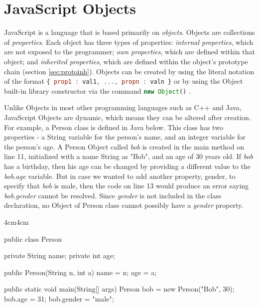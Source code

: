 \documentclass[a4paper,11pt,twoside]{report}
\def\jsinline{\lstinline[language=JavaScript, basicstyle=\small]}%\end{lstlisting}
\begin{document}
\section{JavaScript Objects}
JavaScript is a language that is based primarily on \emph{objects}. Objects are collections of \emph{properties}. Each object has three types of properties: \emph{internal properties}, which are not exposed to the programmer; \emph{own properties}, which are defined within that object; and \emph{inherited properties}, which are defined within the object's prototype chain (section \ref{sec:protoinh}). Objects can be created by using the literal notation of the format \jsinline|{ prop1 : val1, ..., propn : valn }| or by using the Object built-in library constructor via the command \jsinline|new Object()| \cite{EcmaScript}.


Unlike Objects in most other programming languages such as C++ and Java, JavaScript Objects are dynamic, which means they can be altered after creation. For example, a Person class is defined in Java below. This class has two properties - a String variable for the person's name, and an integer variable for the person's age. A Person Object called \textit{bob} is created in the main method on line 11, initialized with a name String as "Bob", and an age of 30 years old. If \textit{bob} has a birthday, then his age can be changed by providing a different value to the \textit{bob.age} variable. But in case we wanted to add another property, gender, to specify that \textit{bob} is male, then the code on line 13 would produce an error saying \textit{bob.gender} cannot be resolved. Since \textit{gender} is not included in the class declaration, no Object of Person class cannot possibly have a \textit{gender} property.

\begin{adjustwidth}{4cm}{4cm}
\begin{lstjs}
public class Person {
    private String name;
    private int age;
    
    public Person(String n, int a) {
        name = n;
        age = a;
    }
    
    public static void main(String[] args) {
        Person bob = new Person("Bob", 30);
        bob.age = 31;
        bob.gender = "male";
    }
}
\end{lstjs}
\end{adjustwidth}
\end{document}
